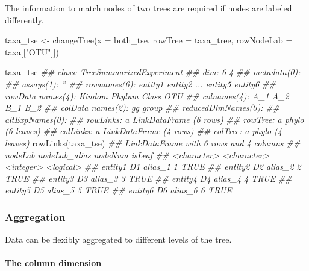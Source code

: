 \documentclass[]{article}
\newcommand{\hlstr}[1]{\textcolor[rgb]{0.251,0.627,0.251}{#1}}%
\newcommand{\hlcom}[1]{\textcolor[rgb]{0.502,0.502,0.502}{\textit{#1}}}%
\newcommand{\hlstd}[1]{\textcolor[rgb]{0.251,0.251,0.251}{#1}}%
\newcommand{\hlkwc}[1]{\textcolor[rgb]{0.251,0.251,0.251}{#1}}%
\newcommand{\hlkwd}[1]{\textcolor[rgb]{0.878,0.439,0.125}{#1}}%
\newenvironment{Shaded}{\begin{myshaded}}{\end{myshaded}}
\newcommand{\KeywordTok}[1]{\hlkwd{#1}}
\newcommand{\DataTypeTok}[1]{\hlkwc{#1}}
\newcommand{\StringTok}[1]{\hlstr{#1}}
\newcommand{\CommentTok}[1]{\hlcom{#1}}
\newcommand{\NormalTok}[1]{\hlstd{#1}}
\begin{document}
The information to match nodes of two trees are required if nodes are labeled differently.

\begin{Shaded}
\begin{Highlighting}[]
\NormalTok{taxa_tse <-}\StringTok{ }\KeywordTok{changeTree}\NormalTok{(}\DataTypeTok{x =}\NormalTok{ both_tse, }\DataTypeTok{rowTree =}\NormalTok{ taxa_tree, }
                       \DataTypeTok{rowNodeLab =}\NormalTok{ taxa[[}\StringTok{"OTU"}\NormalTok{]])}

\NormalTok{taxa_tse}
\CommentTok{## class: TreeSummarizedExperiment }
\CommentTok{## dim: 6 4 }
\CommentTok{## metadata(0):}
\CommentTok{## assays(1): ''}
\CommentTok{## rownames(6): entity1 entity2 ... entity5 entity6}
\CommentTok{## rowData names(4): Kindom Phylum Class OTU}
\CommentTok{## colnames(4): A_1 A_2 B_1 B_2}
\CommentTok{## colData names(2): gg group}
\CommentTok{## reducedDimNames(0):}
\CommentTok{## altExpNames(0):}
\CommentTok{## rowLinks: a LinkDataFrame (6 rows)}
\CommentTok{## rowTree: a phylo (6 leaves)}
\CommentTok{## colLinks: a LinkDataFrame (4 rows)}
\CommentTok{## colTree: a phylo (4 leaves)}
\KeywordTok{rowLinks}\NormalTok{(taxa_tse)}
\CommentTok{## LinkDataFrame with 6 rows and 4 columns}
\CommentTok{##             nodeLab nodeLab_alias   nodeNum    isLeaf}
\CommentTok{##         <character>   <character> <integer> <logical>}
\CommentTok{## entity1          D1       alias_1         1      TRUE}
\CommentTok{## entity2          D2       alias_2         2      TRUE}
\CommentTok{## entity3          D3       alias_3         3      TRUE}
\CommentTok{## entity4          D4       alias_4         4      TRUE}
\CommentTok{## entity5          D5       alias_5         5      TRUE}
\CommentTok{## entity6          D6       alias_6         6      TRUE}
\end{Highlighting}
\end{Shaded}

\hypertarget{aggregation}{%
\subsubsection{Aggregation}\label{aggregation}}

Data can be flexibly aggregated to different levels of the tree.

\hypertarget{aggCol}{%
\paragraph{The column dimension}\label{aggCol}}
\end{document}
